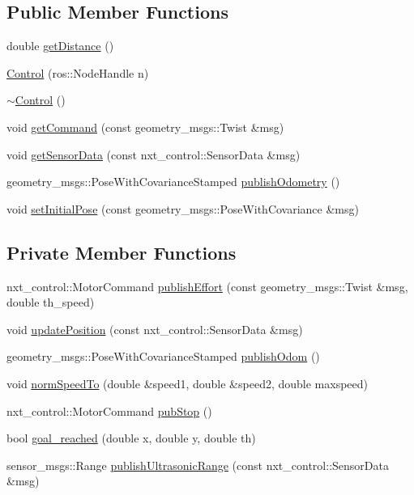 \subsection*{Public Member Functions}
\begin{DoxyCompactItemize}
\item 
double \hyperlink{classControl_a775cd16905c89b9976935c0fcac16819}{get\-Distance} ()
\item 
\hyperlink{classControl_a497563ec0593b497d2611c1fc49e46db}{Control} (ros\-::\-Node\-Handle n)
\item 
\hyperlink{classControl_aedda1328c4f8b8d49bca8f0812d3bfd1}{$\sim$\-Control} ()
\item 
void \hyperlink{classControl_a26712b5c951b7867390ddcc6b0dd8dce}{get\-Command} (const geometry\-\_\-msgs\-::\-Twist \&msg)
\item 
void \hyperlink{classControl_a533326e0d21ff3d104495d6bd34a6300}{get\-Sensor\-Data} (const nxt\-\_\-control\-::\-Sensor\-Data \&msg)
\item 
geometry\-\_\-msgs\-::\-Pose\-With\-Covariance\-Stamped \hyperlink{classControl_a76545b2751f147c71760c98620e96cdc}{publish\-Odometry} ()
\item 
void \hyperlink{classControl_a2e30ee0e4acae0c6f9266bd94fea679e}{set\-Initial\-Pose} (const geometry\-\_\-msgs\-::\-Pose\-With\-Covariance \&msg)
\end{DoxyCompactItemize}
\subsection*{Private Member Functions}
\begin{DoxyCompactItemize}
\item 
nxt\-\_\-control\-::\-Motor\-Command \hyperlink{classControl_a5b7c8066cc7de499d5a5f6727f975b63}{publish\-Effort} (const geometry\-\_\-msgs\-::\-Twist \&msg, double th\-\_\-speed)
\item 
void \hyperlink{classControl_ae4d44c4c8a9a322c8d7cb0e84e408c74}{update\-Position} (const nxt\-\_\-control\-::\-Sensor\-Data \&msg)
\item 
geometry\-\_\-msgs\-::\-Pose\-With\-Covariance\-Stamped \hyperlink{classControl_a30aa3c2a10b629e35f8e0b86c8e9cb8c}{publish\-Odom} ()
\item 
void \hyperlink{classControl_a8ee4dbe468dc391360c69b45d5af1fb1}{norm\-Speed\-To} (double \&speed1, double \&speed2, double maxspeed)
\item 
nxt\-\_\-control\-::\-Motor\-Command \hyperlink{classControl_aa031d7a2017458e7181a38cd6f403de0}{pub\-Stop} ()
\item 
bool \hyperlink{classControl_a228637543b285e4fd0caf2ec0ceacd7a}{goal\-\_\-reached} (double x, double y, double th)
\item 
sensor\-\_\-msgs\-::\-Range \hyperlink{classControl_a8f688474b0a6e43ba50e5e22eea6d336}{publish\-Ultrasonic\-Range} (const nxt\-\_\-control\-::\-Sensor\-Data \&msg)
\end{DoxyCompactItemize}
